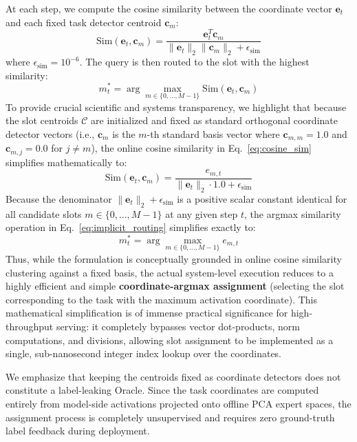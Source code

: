 At each step, we compute the cosine similarity between the coordinate vector $\mathbf{e}_t$ and each fixed task detector centroid $\mathbf{c}_m$:
\begin{equation}
\label{eq:cosine_sim}
\text{Sim}(\mathbf{e}_t, \mathbf{c}_m) = \frac{\mathbf{e}_t^T \mathbf{c}_m}{\|\mathbf{e}_t\|_2 \|\mathbf{c}_m\|_2 + \epsilon_{\text{sim}}}
\end{equation}
where $\epsilon_{\text{sim}} = 10^{-6}$. The query is then routed to the slot with the highest similarity:
\begin{equation}
\label{eq:implicit_routing}
m^*_t = \arg\max_{m \in \{0, \dots, M-1\}} \text{Sim}(\mathbf{e}_t, \mathbf{c}_m)
\end{equation}
To provide crucial scientific and systems transparency, we highlight that because the slot centroids $\mathcal{C}$ are initialized and fixed as standard orthogonal coordinate detector vectors (i.e., $\mathbf{c}_m$ is the $m$-th standard basis vector where $\mathbf{c}_{m, m} = 1.0$ and $\mathbf{c}_{m, j} = 0.0$ for $j \neq m$), the online cosine similarity in Eq.~\ref{eq:cosine_sim} simplifies mathematically to:
\begin{equation}
\label{eq:cosine_sim_simple}
\text{Sim}(\mathbf{e}_t, \mathbf{c}_m) = \frac{e_{m, t}}{\|\mathbf{e}_t\|_2 \cdot 1.0 + \epsilon_{\text{sim}}}
\end{equation}
Because the denominator $\|\mathbf{e}_t\|_2 + \epsilon_{\text{sim}}$ is a positive scalar constant identical for all candidate slots $m \in \{0, \dots, M-1\}$ at any given step $t$, the argmax similarity operation in Eq.~\ref{eq:implicit_routing} simplifies exactly to:
\begin{equation}
\label{eq:argmax_coord}
m^*_t = \arg\max_{m \in \{0, \dots, M-1\}} e_{m, t}
\end{equation}
Thus, while the formulation is conceptually grounded in online cosine similarity clustering against a fixed basis, the actual system-level execution reduces to a highly efficient and simple \textbf{coordinate-argmax assignment} (selecting the slot corresponding to the task with the maximum activation coordinate). This mathematical simplification is of immense practical significance for high-throughput serving: it completely bypasses vector dot-products, norm computations, and divisions, allowing slot assignment to be implemented as a single, sub-nanosecond integer index lookup over the coordinates.

We emphasize that keeping the centroids fixed as coordinate detectors does not constitute a label-leaking Oracle. Since the task coordinates are computed entirely from model-side activations projected onto offline PCA expert spaces, the assignment process is completely unsupervised and requires zero ground-truth label feedback during deployment.

